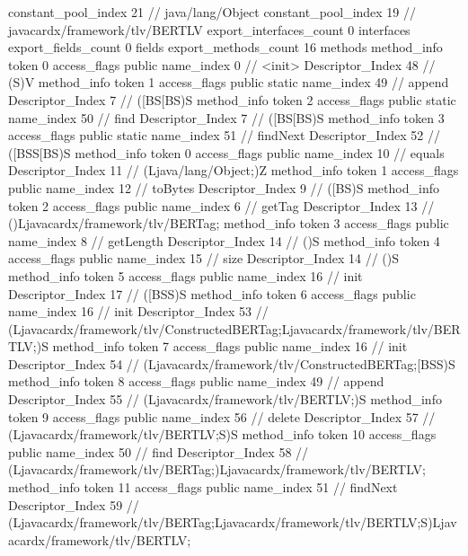 {{{{				constant_pool_index	21		// java/lang/Object
				constant_pool_index	19		// javacardx/framework/tlv/BERTLV
			}
			export_interfaces_count	0
			interfaces {
			}
			export_fields_count	0
			fields {
			}
			export_methods_count	16
			methods {
				method_info {
					token	0
					access_flags	public
					name_index	0		// <init>
					Descriptor_Index	48		// (S)V
				}
				method_info {
					token	1
					access_flags	public static
					name_index	49		// append
					Descriptor_Index	7		// ([BS[BS)S
				}
				method_info {
					token	2
					access_flags	public static
					name_index	50		// find
					Descriptor_Index	7		// ([BS[BS)S
				}
				method_info {
					token	3
					access_flags	public static
					name_index	51		// findNext
					Descriptor_Index	52		// ([BSS[BS)S
				}
				method_info {
					token	0
					access_flags	public
					name_index	10		// equals
					Descriptor_Index	11		// (Ljava/lang/Object;)Z
				}
				method_info {
					token	1
					access_flags	public
					name_index	12		// toBytes
					Descriptor_Index	9		// ([BS)S
				}
				method_info {
					token	2
					access_flags	public
					name_index	6		// getTag
					Descriptor_Index	13		// ()Ljavacardx/framework/tlv/BERTag;
				}
				method_info {
					token	3
					access_flags	public
					name_index	8		// getLength
					Descriptor_Index	14		// ()S
				}
				method_info {
					token	4
					access_flags	public
					name_index	15		// size
					Descriptor_Index	14		// ()S
				}
				method_info {
					token	5
					access_flags	public
					name_index	16		// init
					Descriptor_Index	17		// ([BSS)S
				}
				method_info {
					token	6
					access_flags	public
					name_index	16		// init
					Descriptor_Index	53		// (Ljavacardx/framework/tlv/ConstructedBERTag;Ljavacardx/framework/tlv/BERTLV;)S
				}
				method_info {
					token	7
					access_flags	public
					name_index	16		// init
					Descriptor_Index	54		// (Ljavacardx/framework/tlv/ConstructedBERTag;[BSS)S
				}
				method_info {
					token	8
					access_flags	public
					name_index	49		// append
					Descriptor_Index	55		// (Ljavacardx/framework/tlv/BERTLV;)S
				}
				method_info {
					token	9
					access_flags	public
					name_index	56		// delete
					Descriptor_Index	57		// (Ljavacardx/framework/tlv/BERTLV;S)S
				}
				method_info {
					token	10
					access_flags	public
					name_index	50		// find
					Descriptor_Index	58		// (Ljavacardx/framework/tlv/BERTag;)Ljavacardx/framework/tlv/BERTLV;
				}
				method_info {
					token	11
					access_flags	public
					name_index	51		// findNext
					Descriptor_Index	59		// (Ljavacardx/framework/tlv/BERTag;Ljavacardx/framework/tlv/BERTLV;S)Ljavacardx/framework/tlv/BERTLV;
}}}}}
